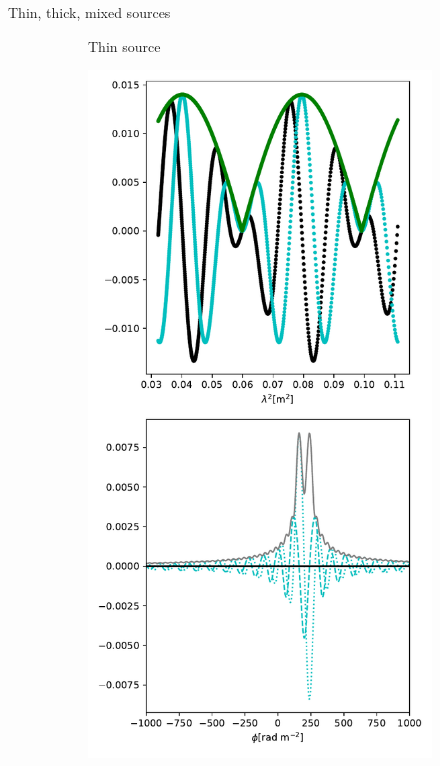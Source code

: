 \documentclass[xetex,aspectratio=169]{beamer}
\begin{document}
\begin{frame}{Thin, thick, mixed sources}
\begin{figure}
\begin{subfigure}{0.2\textwidth}
                \caption{Thin source}
            \end{subfigure}
            \begin{subfigure}{0.2\textwidth}
                \includegraphics[width=\textwidth]{figures/sources/thick_source.pdf}

\end{subfigure}
\end{figure}
\end{frame}
\end{document}

